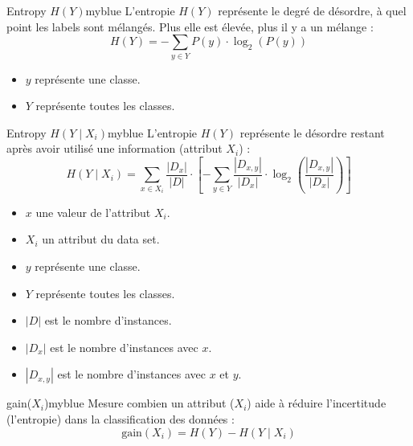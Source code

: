 \documentclass{article}
\begin{document}
\vspace{0.15cm}

\begin{prettyBox}{Entropy $H(Y)$}{myblue}
    L'entropie $H(Y)$ représente le degré de désordre, à quel point les labels sont mélangés. Plus elle est élevée,
    plus il y a un mélange :
    \[ H(Y) = - \sum_{y \in Y} P(y) \cdot \log_2(P(y)) \]
    \begin{itemize}
        \setlength{\itemsep}{0pt}
        \item $y$ représente une classe.
        \item $Y$ représente toutes les classes.
    \end{itemize}
\end{prettyBox}


\vspace{0.15cm}


\begin{prettyBox}{Entropy $H(Y \mid X_i)$}{myblue}
    L'entropie $H(Y)$ représente le désordre restant après avoir utilisé une information (attribut $X_i$) : 
    \[ H(Y \mid X_i) = \sum_{x \in X_i} \dfrac{|D_{x}|}{|D|} \cdot  \left[-\sum_{y \in Y} \dfrac{|D_{x , y}|}{|D_{x}|} \cdot \log_2\left( \dfrac{|D_{x , y}|}{|D_{x}|} \right) \right] \]
    \begin{itemize}
        \setlength{\itemsep}{0pt}
        \item $x$ une valeur de l'attribut $X_i$.
        \item $X_i$ un attribut du data set.
        \item $y$ représente une classe.
        \item $Y$ représente toutes les classes.
        \item $|D|$ est le nombre d'instances.
        \item $|D_x|$ est le nombre d'instances avec $x$.
        \item $|D_{x , y}|$ est le nombre d'instances avec $x$ et $y$.
    \end{itemize}
\end{prettyBox}

\newpage


\begin{prettyBox}{gain($X_i$)}{myblue}
    Mesure combien un attribut ($X_i$) aide à réduire l'incertitude (l'entropie) dans la classification des données :
    \[
        \text{gain}(X_i) = H(Y) - H(Y \mid X_i)
    \]
\end{prettyBox}

\vspace{0.35cm}
\end{document}

